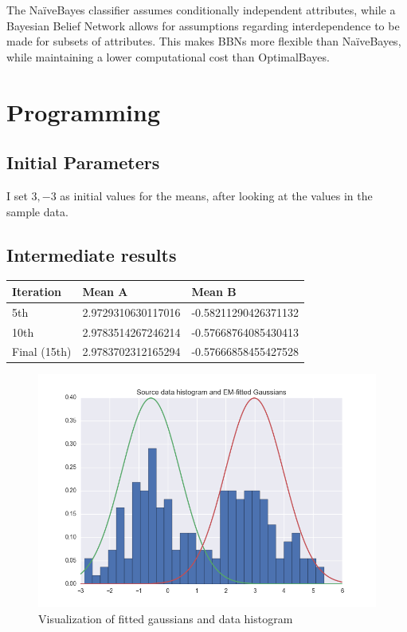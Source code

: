 \documentclass[paper=a4, fontsize=11pt]{scrartcl} %
\numberwithin{equation}{section} %
\numberwithin{figure}{section} %
\numberwithin{table}{section} %
\begin{document}
The NaïveBayes classifier assumes conditionally independent attributes, while a Bayesian Belief Network allows for assumptions regarding interdependence to be made for subsets of attributes.
This makes BBNs more flexible than NaïveBayes, while maintaining a lower computational cost than OptimalBayes.

\section{Programming}

\subsection{Initial Parameters}

I set $3, -3$ as initial values for the means, after looking at the values in the sample data.

\subsection{Intermediate results}

\begin{table}[H]
    \begin{tabular}{l|l|l}
    Iteration    & Mean A             & Mean B               \\ \hline
    5th          & 2.9729310630117016 & -0.58211290426371132 \\ \hline
    10th         & 2.9783514267246214 & -0.57668764085430413 \\ \hline
    Final (15th) & 2.9783702312165294 & -0.57666858455427528 \\
    \end{tabular}
\end{table}

\begin{figure}[H]
    \centering
    \includegraphics[width=0.8\linewidth]{img/visualization.png}
    \caption{Visualization of fitted gaussians and data histogram} \label{fig:visualization}
\end{figure}

\printbibliography
\end{document}
